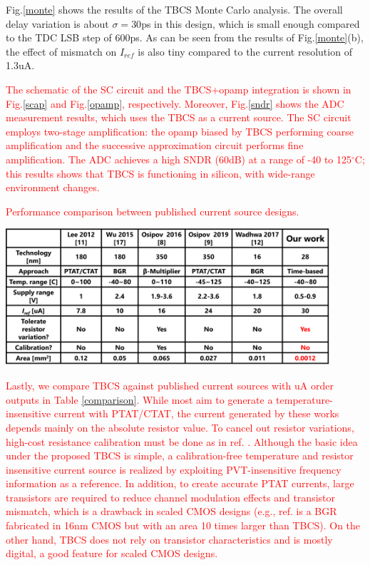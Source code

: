 \documentclass[paper]{ieice}
\begin{document}
Fig.\ref{monte} shows the results of the TBCS Monte Carlo analysis. The overall delay variation is about $\sigma= 30$ps in this design, which is small enough compared to the TDC LSB step of 600ps. As can be seen from the results of Fig.\ref{monte}(b), the effect of mismatch on $I_{ref}$ is also tiny compared to the current resolution of 1.3uA. %

\textcolor{red}{
The schematic of the SC circuit and the TBCS+opamp integration is shown in Fig.\ref{scap} and Fig.\ref{opamp}, respectively. Moreover, Fig.\ref{sndr} shows the ADC measurement results, which uses the TBCS as a current source. The SC circuit employs two-stage amplification: the opamp biased by TBCS performing coarse amplification and the successive approximation circuit performs fine amplification. The ADC achieves a high SNDR (60dB) at a range of -40 to 125$^\circ$C; this results shows that TBCS is functioning in silicon, with wide-range environment changes.}

\begin{table}[!t]
\centering
\caption{\textcolor{red}{Performance comparison between published current source designs.}}
 \includegraphics[width=0.9\textwidth]{figs/comparison.png}
\label{comparison}
\end{table}

\textcolor{red}{Lastly, we compare TBCS against published current sources with uA order outputs in Table \ref{comparison}. While most aim to generate a temperature-insensitive current with PTAT/CTAT, the current generated by these works depends mainly on the absolute resistor value. To cancel out resistor variations, high-cost resistance calibration must be done as in ref. \cite{osipov2016temperature}. Although the basic idea under the proposed TBCS is simple, a calibration-free temperature and resistor insensitive current source is realized by exploiting PVT-insensitive frequency information as a reference. In addition, to create accurate PTAT currents, large transistors are required to reduce channel modulation effects and transistor mismatch, which is a drawback in scaled CMOS designs (e.g., ref. \cite{wadhwa2017high} is a BGR fabricated in 16nm CMOS but with an area 10 times larger than TBCS). On the other hand, TBCS does not rely on transistor characteristics and is mostly digital, a good feature for scaled CMOS designs.}
\end{document}
